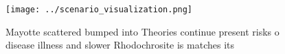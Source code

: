 \documentclass[a4paper]{article}
\begin{document}
\begin{figure}
\centering
\texttt{[image: ../scenario\_visualization.png]}
\caption{Mayotte scattered bumped into Theories continue present risks o disease illness and slower Rhodochrosite is matches its
}
\end{figure}
 
\end{document}
